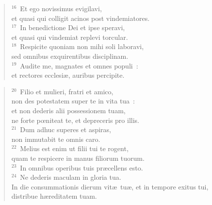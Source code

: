 \begin{verse}${}^{16}$~Et ego novissimus evigilavi,\\ et quasi qui colligit acinos post vindemiatores.\\
${}^{17}$~In benedictione Dei et ipse speravi,\\ et quasi qui vindemiat replevi torcular.\\
${}^{18}$~Respicite quoniam non mihi soli laboravi,\\ sed omnibus exquirentibus disciplinam.\\
${}^{19}$~Audite me, magnates et omnes populi~:\\ et rectores ecclesi\ae , auribus percipite.\end{verse}


\begin{verse}${}^{20}$~Filio et mulieri, fratri et amico,\\ non des potestatem super te in vita tua~:\\ et non dederis alii possessionem tuam,\\ ne forte pœniteat te, et depreceris pro illis.\\
${}^{21}$~Dum adhuc superes et aspiras,\\ non immutabit te omnis caro.\\
${}^{22}$~Melius est enim ut filii tui te rogent,\\ quam te respicere in manus filiorum tuorum.\\
${}^{23}$~In omnibus operibus tuis pr\ae cellens esto.\\
${}^{24}$~Ne dederis maculam in gloria tua.\\ In die consummationis dierum vit\ae\ tu\ae , et in tempore exitus tui,\\ distribue h\ae reditatem tuam.\end{verse}


